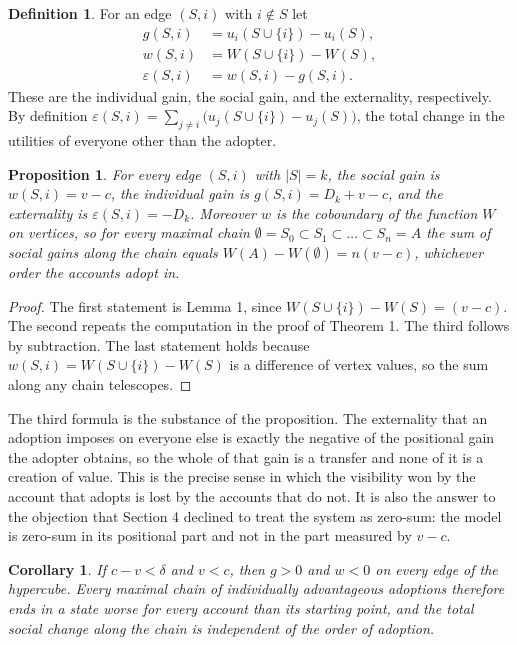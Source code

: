 \documentclass[12pt]{article}
\theoremstyle{plain}
\newtheorem{proposition}{Proposition}
\newtheorem{corollary}{Corollary}
\theoremstyle{definition}
\newtheorem{definition}{Definition}
\begin{document}
\begin{definition}
For an edge $(S,i)$ with $i\notin S$ let
\begin{align*}
g(S,i)&=u_i(S\cup\{i\})-u_i(S),\\
w(S,i)&=W(S\cup\{i\})-W(S),\\
\varepsilon(S,i)&=w(S,i)-g(S,i).
\end{align*}
These are the individual gain, the social gain, and the externality, respectively. By definition $\varepsilon(S,i)=\sum_{j\ne i}\bigl(u_j(S\cup\{i\})-u_j(S)\bigr)$, the total change in the utilities of everyone other than the adopter.
\end{definition}

\begin{proposition}
For every edge $(S,i)$ with $|S|=k$, the social gain is $w(S,i)=v-c$, the individual gain is $g(S,i)=D_k+v-c$, and the externality is $\varepsilon(S,i)=-D_k$. Moreover $w$ is the coboundary of the function $W$ on vertices, so for every maximal chain $\emptyset=S_0\subset S_1\subset\dots\subset S_n=A$ the sum of social gains along the chain equals $W(A)-W(\emptyset)=n(v-c)$, whichever order the accounts adopt in.
\end{proposition}

\begin{proof}
The first statement is Lemma 1, since $W(S\cup\{i\})-W(S)=(v-c)$. The second repeats the computation in the proof of Theorem 1. The third follows by subtraction. The last statement holds because $w(S,i)=W(S\cup\{i\})-W(S)$ is a difference of vertex values, so the sum along any chain telescopes.
\end{proof}

The third formula is the substance of the proposition. The externality that an adoption imposes on everyone else is exactly the negative of the positional gain the adopter obtains, so the whole of that gain is a transfer and none of it is a creation of value. This is the precise sense in which the visibility won by the account that adopts is lost by the accounts that do not. It is also the answer to the objection that Section 4 declined to treat the system as zero-sum: the model is zero-sum in its positional part and not in the part measured by $v-c$.

\begin{corollary}
If $c-v<\delta$ and $v<c$, then $g>0$ and $w<0$ on every edge of the hypercube. Every maximal chain of individually advantageous adoptions therefore ends in a state worse for every account than its starting point, and the total social change along the chain is independent of the order of adoption.
\end{corollary}
\end{document}
